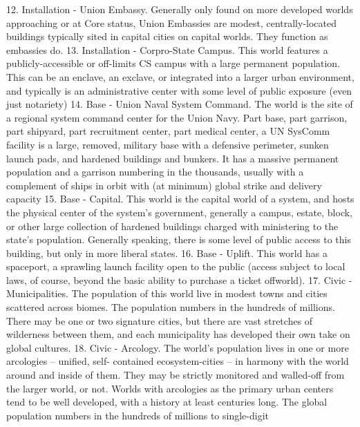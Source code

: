      12. Installation - Union Embassy. Generally only found on more developed worlds
         approaching or at Core status, Union Embassies are modest, centrally-located buildings
         typically sited in capital cities on capital worlds. They function as embassies do.
     13. Installation - Corpro-State Campus. This world features a publicly-accessible or off-limits
         CS campus with a large permanent population. This can be an enclave, an exclave, or
         integrated into a larger urban environment, and typically is an administrative center with
         some level of public exposure (even just notariety)
     14. Base - Union Naval System Command. The world is the site of a regional system
         command center for the Union Navy. Part base, part garrison, part shipyard, part
         recruitment center, part medical center, a UN SysComm facility is a large, removed,
         military base with a defensive perimeter, sunken launch pads, and hardened buildings and
         bunkers. It has a massive permanent population and a garrison numbering in the
         thousands, usually with a complement of ships in orbit with (at minimum) global strike and
         delivery capacity
     15. Base - Capital. This world is the capital world of a system, and hosts the physical center of
         the system's government, generally a campus, estate, block, or other large collection of
         hardened buildings charged with ministering to the state's population. Generally speaking,
         there is some level of public access to this building, but only in more liberal states.
     16. Base - Uplift. This world has a spaceport, a sprawling launch facility open to the public
         (access subject to local laws, of course, beyond the basic ability to purchase a ticket
         offworld).
     17. Civic - Municipalities. The population of this world live in modest towns and cities scattered
         across biomes. The population numbers in the hundreds of millions. There may be one or
         two signature cities, but there are vast stretches of wilderness between them, and each
         municipality has developed their own take on global cultures.
     18. Civic - Arcology. The world's population lives in one or more arcologies -- unified, self-
         contained ecosystem-cities -- in harmony with the world around and inside of them. They
         may be strictly monitored and walled-off from the larger world, or not. Worlds with
         arcologies as the primary urban centers tend to be well developed, with a history at least
         centuries long. The global population numbers in the hundreds of millions to single-digit
